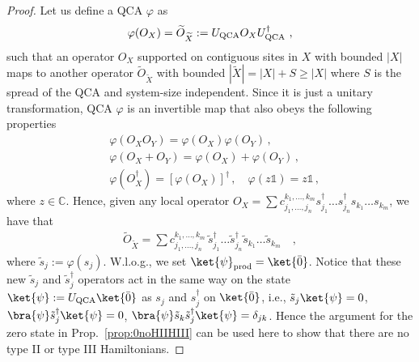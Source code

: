\documentclass[prx,letterpaper,aps,superscriptaddress,floatfix,twocolumn,nofootinbib]{revtex4-2}
\theoremstyle{definition}
\begin{document}
\begin{proof}
    Let us define a QCA $\varphi$ as
    \begin{equation}
        \varphi(O_X) =  \widetilde{O}_{\widetilde{X}}:=U_{\rm QCA} O_X U_{\rm QCA}^\dag ~,
    \end{equation}
    such that an operator $O_X$ supported on contiguous sites in $X$ with bounded $|X|$ maps to another operator $\widetilde{O}_{\widetilde{X}}$ with bounded $|\widetilde{X}|=|X|+S\geq |X|$ where $S$ is the spread of the QCA and system-size independent. 
    Since it is just a unitary transformation, QCA $\varphi$ is an invertible map that also obeys the following properties
    \begin{align}
     &\varphi(O_X O_Y)=\varphi(O_X)\varphi(O_Y) \,, \nonumber \\
     &  \varphi(O_X +O_Y) = \varphi(O_X)+\varphi(O_Y) \,, \nonumber\\
&\varphi(O_X^\dag) = [\varphi(O_X)]^\dag \,, \quad \varphi(z\mathds{1}) = z\mathds{1}\,,
    \end{align}
    where $z\in\mathbb{C}$.
    Hence,  given any local operator $O_{X} = \sum c_{j_1, \dots, j_n}^{k_1, \dots, k_m} s_{j_1}^\dagger \dots s_{j_n}^\dagger s_{k_1} \dots s_{k_m}$,  we have that
   \begin{align}
        \widetilde{O}_{\widetilde{X}}=\sum c_{j_1, \dots, j_n}^{k_1, \dots, k_m} \, \tilde{s}_{j_1}^\dagger \dots \tilde{s}_{j_n}^\dagger \tilde{s}_{k_1} \dots \tilde{s}_{k_m}\quad,
    \end{align}
    where $\tilde{s}_{j}:=\varphi(s_{j})$. 
    W.l.o.g., we set $\ket{\psi}_\text{prod}=\ket{\bar{0}}$. Notice that these new $\tilde{s}_{j}$ and $\tilde{s}_{j}^\dag$ operators act in the same way on the state $\ket{\psi}:=U_{\rm QCA}\ket{\bar{0}}$ as $s_j$ and $s^\dagger_j$ on $\ket{\bar{0}}$,  i.e.,  $\tilde{s}_{j} \ket{\psi}=0$,   $\bra{\psi}\tilde{s}^\dag_{j} \ket{\psi}=0$,  $\bra{\psi}\tilde{s}_{k}\tilde{s}^\dag_{j} \ket{\psi}=\delta_{jk}$. 
    Hence the argument for the zero state in Prop.~\ref{prop:0noHIIHIII} can be used here to show that there are no type II or type III Hamiltonians.
\end{proof}
%
\end{document}
